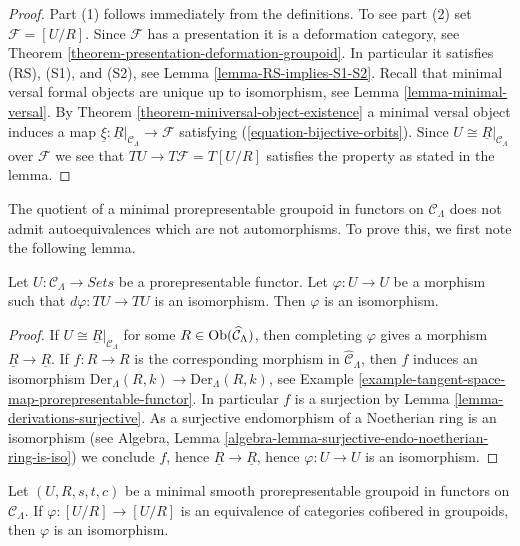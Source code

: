 \begin{proof}
Part (1) follows immediately from the definitions.
To see part (2) set $\mathcal{F} = [U/R]$. Since $\mathcal{F}$
has a presentation it is a deformation category, see
Theorem \ref{theorem-presentation-deformation-groupoid}.
In particular it satisfies (RS), (S1), and (S2), see
Lemma \ref{lemma-RS-implies-S1-S2}.
Recall that minimal versal formal objects are unique up to isomorphism, see
Lemma \ref{lemma-minimal-versal}.
By
Theorem \ref{theorem-miniversal-object-existence}
a minimal versal object induces a map
$\underline{\xi} : \underline{R}|_{\mathcal{C}_\Lambda} \to \mathcal{F}$
satisfying (\ref{equation-bijective-orbits}). Since
$U \cong \underline{R}|_{\mathcal{C}_\Lambda}$ over $\mathcal{F}$
we see that $TU \to T\mathcal{F} = T[U/R]$ satisfies the property
as stated in the lemma.
\end{proof}

\noindent
The quotient of a minimal prorepresentable groupoid in functors on $\mathcal
C_\Lambda$ does not admit autoequivalences which are not automorphisms.  To
prove this, we first note the following lemma.

\begin{lemma}
\label{lemma-surjective-morphism-prorepresentable-functor}
Let $U: \mathcal{C}_\Lambda \to \textit{Sets}$ be a
prorepresentable functor. Let $\varphi : U \to U$ be a morphism such
that $d\varphi : TU \to TU$ is an isomorphism.  Then $\varphi$ is an
isomorphism.
\end{lemma}

\begin{proof}
If $U \cong \underline{R}|_{\mathcal{C}_\Lambda}$ for some
$R \in \mathop{\mathrm{Ob}}\nolimits(\widehat{\mathcal{C}}_\Lambda)$,
then completing $\varphi$ gives a morphism $\underline{R} \to \underline{R}$.
If $f: R \to R$ is the corresponding morphism in
$\widehat{\mathcal{C}}_\Lambda$, then $f$ induces an isomorphism
$\text{Der}_\Lambda(R, k) \to \text{Der}_\Lambda(R, k)$, see
Example \ref{example-tangent-space-map-prorepresentable-functor}.
In particular $f$ is a surjection by
Lemma \ref{lemma-derivations-surjective}.
As a surjective endomorphism of a Noetherian ring is an isomorphism (see
Algebra, Lemma \ref{algebra-lemma-surjective-endo-noetherian-ring-is-iso})
we conclude $f$, hence $\underline{R}
\to \underline{R}$, hence $\varphi : U \to U$
is an isomorphism.
\end{proof}

\begin{lemma}
\label{lemma-minimal-prorepresentable-groupoid-autoequivalence}
Let $(U, R, s, t, c)$ be a minimal smooth prorepresentable groupoid in
functors on $\mathcal{C}_\Lambda$. If $\varphi : [U/R] \to [U/R]$ is an
equivalence of categories cofibered in groupoids, then $\varphi$ is an
isomorphism.
\end{lemma}


